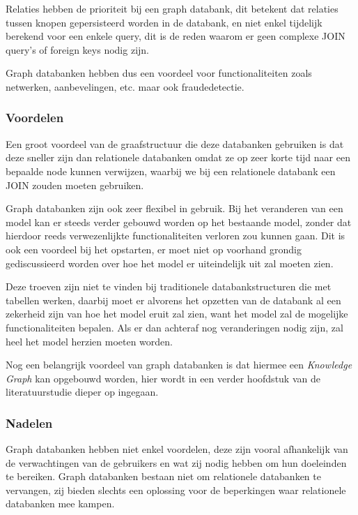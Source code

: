 Relaties hebben de prioriteit bij een graph databank, dit betekent dat relaties tussen knopen gepersisteerd worden in de databank, en niet enkel tijdelijk berekend voor een enkele query, dit is de reden waarom er geen complexe JOIN query's of foreign keys nodig zijn.

Graph databanken hebben dus een voordeel voor functionaliteiten zoals netwerken, aanbevelingen, etc. maar ook fraudedetectie. 

\subsubsection{Voordelen}
\label{subsec:Voordelen Graph}

Een groot voordeel van de graafstructuur die deze databanken gebruiken is dat deze sneller zijn dan relationele databanken omdat ze op zeer korte tijd naar een bepaalde node kunnen verwijzen, waarbij we bij een relationele databank een JOIN zouden moeten gebruiken. 

Graph databanken zijn ook zeer flexibel in gebruik. Bij het veranderen van een model kan er steeds verder gebouwd worden op het bestaande model, zonder dat hierdoor reeds verwezenlijkte functionaliteiten verloren zou kunnen gaan.
Dit is ook een voordeel bij het opstarten, er moet niet op voorhand grondig gediscussieerd worden over hoe het model er uiteindelijk uit zal moeten zien.

Deze troeven zijn niet te vinden bij traditionele databankstructuren die met tabellen werken, daarbij moet er alvorens het opzetten van de databank al een zekerheid zijn van hoe het model eruit zal zien, want het model zal de mogelijke functionaliteiten bepalen. Als er dan achteraf nog veranderingen nodig zijn, zal heel het model herzien moeten worden.

Nog een belangrijk voordeel van graph databanken is dat hiermee een \textit{Knowledge Graph} kan opgebouwd worden, hier wordt in een verder hoofdstuk van de literatuurstudie dieper op ingegaan.

\subsubsection{Nadelen}
\label{subsec: Nadelen Graph}

Graph databanken hebben niet enkel voordelen, deze zijn vooral afhankelijk van de verwachtingen van de gebruikers en wat zij nodig hebben om hun doeleinden te bereiken. Graph databanken bestaan niet om relationele databanken te vervangen, zij bieden slechts een oplossing voor de beperkingen waar relationele databanken mee kampen.

